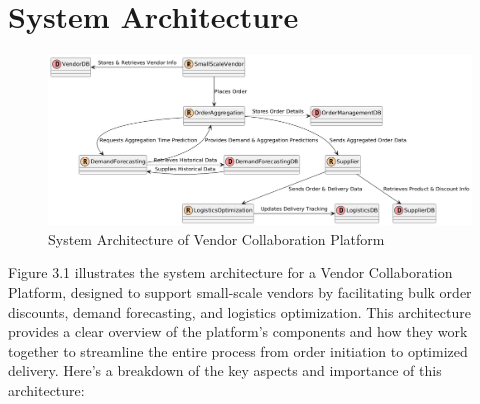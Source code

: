 
\chapter{System Architecture}


\begin{figure}[h]
    \centering
    \includegraphics[width=\textwidth]{Figures/system_arch.png}
    \caption{System Architecture of Vendor Collaboration Platform}
    \label{fig:architecture}
\end{figure}

\noindent Figure 3.1 illustrates the system architecture for a Vendor Collaboration Platform, designed to support small-scale vendors by facilitating bulk order discounts, demand forecasting, and logistics optimization. This architecture provides a clear overview of the platform’s components and how they work together to streamline the entire process from order initiation to optimized delivery. Here’s a breakdown of the key aspects and importance of this architecture:


